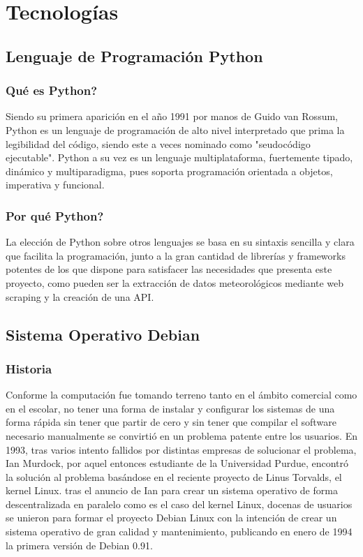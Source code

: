 \chapter[Tecnologías]{Tecnologías}
\label{Chap2}

\section{Lenguaje de Programación Python}

\subsection{Qué es Python?}
Siendo su primera aparición en el año 1991 por manos de Guido van Rossum, Python es un lenguaje de programación de alto nivel interpretado que prima la legibilidad del código, siendo este a veces nominado como "seudocódigo ejecutable". \cite{WinNT}
\newline
\newline
Python a su vez es un lenguaje multiplataforma, fuertemente tipado, dinámico y multiparadigma, pues soporta programación orientada a objetos, imperativa y funcional.

\subsection{Por qué Python?}
La elección de Python sobre otros lenguajes se basa en su sintaxis sencilla y clara que facilita la programación, junto a la gran cantidad de librerías y frameworks potentes de los que dispone para satisfacer las necesidades que presenta este proyecto, como pueden ser la extracción de datos meteorológicos mediante web scraping y la creación de una API.

\newpage

\section{Sistema Operativo Debian}

\subsection{Historia}
Conforme la computación fue tomando terreno tanto en el ámbito comercial como en el escolar, no tener una forma de instalar y configurar los sistemas de una forma rápida sin tener que partir de cero y sin tener que compilar el software necesario manualmente se convirtió en un problema patente entre los usuarios.
\newline
\newline
En 1993, tras varios intento fallidos por distintas empresas de solucionar el problema, Ian Murdock, por aquel entonces estudiante de la Universidad Purdue, encontró la solución al problema basándose en el reciente proyecto de Linus Torvalds, el kernel Linux. tras el anuncio de Ian para crear un sistema operativo de forma descentralizada en paralelo como es el caso del kernel Linux, docenas de usuarios se unieron para formar el proyecto Debian Linux con la intención de crear un sistema operativo de gran calidad y mantenimiento, publicando en enero de 1994 la primera versión de Debian 0.91.

